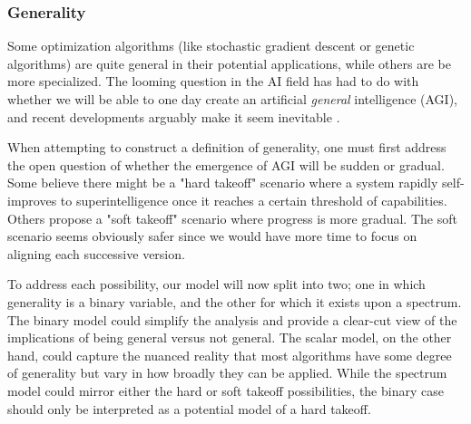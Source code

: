 \documentclass{article}[10pt]
\begin{document}
\subsubsection{Generality}
\label{subsubsection:generality}
Some optimization algorithms (like stochastic gradient descent or genetic algorithms) are quite general in their potential applications, while others are be more specialized.
The looming question in the AI field has had to do with whether we will be able to one day create an artificial \textit{general} intelligence (AGI), and recent developments arguably make it seem inevitable \cite{Bubeck2023SparksOA}.\par

When attempting to construct a definition of generality, one must first address the open question of whether the emergence of AGI will be sudden or gradual.
Some believe there might be a "hard takeoff" scenario where a system rapidly self-improves to superintelligence once it reaches a certain threshold of capabilities. 
Others propose a "soft takeoff" scenario where progress is more gradual.
The soft scenario seems obviously safer since we would have more time to focus on aligning each successive version.\par

To address each possibility, our model will now split into two; one in which generality is a binary variable, and the other for which it exists upon a spectrum.
The binary model could simplify the analysis and provide a clear-cut view of the implications of being general versus not general.
The scalar model, on the other hand, could capture the nuanced reality that most algorithms have some degree of generality but vary in how broadly they can be applied.
While the spectrum model could mirror either the hard or soft takeoff possibilities, the binary case should only be interpreted as a potential model of a hard takeoff.\par
\end{document}
